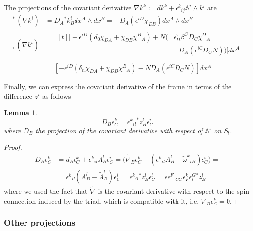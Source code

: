 \documentclass[a4paper, 11pt]{article}
\def\A{\mathbb{A}}
\def\be{\beta}
\def\de{\delta}
\def\ep{\epsilon}
\def\om{\omega}
\def\na{\nabla}
\newtheorem{lma}[equation]{Lemma}
\def\we{\wedge}
\def\tp#1{{}^\ast\!#1}
\def\np#1{{}_\circ#1}
\numberwithin{equation}{section}
\begin{document}
The projections of the covariant derivative $\na k^k := dk^k + \ep^k{}_{ij} \A^i \we k^j $  are
\begin{subequations}
    \begin{align}
        \tp\,(\na k^i) &= D_A \tp k^i_B dx^A\we dx^B = -D_A\left(\ep^{iD}\chi_{DB}\right)dx^A \we dx^B \label{eq:naktangent}\\ 
        \np\,(\na k^i) &= \begin{aligned}[t]
            \Big[- \ep^{iD}\left(d_0 \chi_{DA} + \chi_{DB} \chi^B{}_A\right) + \bar N\big(&\ep^i_D\be^CD_C\chi^D{}_A \\ &- D_A\left(\ep^{iC}D_CN\right)\big)\Big] dx^A \\ 
        \end{aligned} \\ 
        &= \left[- \ep^{iD}\left(\de_n \chi_{DA} + \chi_{DB} \chi^B{}_A\right) - \bar N D_A\left(\ep^{iC}D_CN\right)\right] dx^A
    \end{align}
    \label{eq:projections_na_A_k}
\end{subequations}

Finally, we can express the covariant derivative of the frame in terms of the difference $z^i$ as follows
\begin{lma}
    \[D_B \ep^k_C = \ep^k {}_{il} \tp z^l_B \ep^i_C\]
    where $D_B$ the projection of the covariant derivative with respect of $\A^i$ on $S_t$. \label{lma:covder_ep}
\end{lma}
\begin{proof}
\begin{align*}
    D_B \ep^k_C &= d_B\ep^k_C + \ep^k{}_{il}A^l_B \ep^i_C=  \Big(\tilde\na_B \ep^k_C + \left(\ep^k{}_{il}A^l_B - \tilde \om^k{}_{iB}\right)\ep^i_C\Big) = \nonumber \\
    &= \ep^k{}_{il}\left(A^l_B - \tilde A^l_B\right)\ep^i_C = \ep^k{}_{il} \tp z^l_B\ep^i_C = \ep \ep^F_{\> \cdot  \> CG} \ep^k_F \ep^G_l \tp z^l_B 
\end{align*}    
where we used the fact that $\tilde \na$ is the covariant derivative with respect to the spin connection induced by the triad, which is compatible with it, i.e. $\tilde \na_B \ep^k_C = 0$.
\end{proof}



\subsubsection{Other projections}
\end{document}
